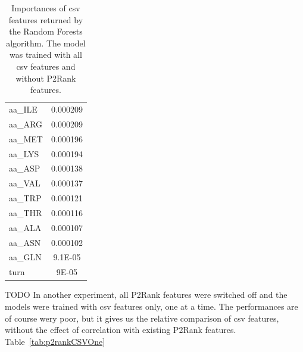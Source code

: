 \begin{table}[]
{\begin{tabular}{@{}lc@{}}
aa\_ILE              & 0.000209            \\
aa\_ARG              & 0.000209            \\
aa\_MET              & 0.000196            \\
aa\_LYS              & 0.000194            \\
aa\_ASP              & 0.000138            \\
aa\_VAL              & 0.000137            \\
aa\_TRP              & 0.000121            \\
aa\_THR              & 0.000116            \\
aa\_ALA              & 0.000107            \\
aa\_ASN              & 0.000102            \\
aa\_GLN              & 9.1E-05             \\
turn                 & 9E-05               \\ \bottomrule
\end{tabular}
}
\caption{Importances of csv features returned by the Random Forests algorithm. The model was trained with all csv features and without P2Rank features.}
\label{tab:importances}
\end{table}

TODO In another experiment, all P2Rank features were switched off and the models were trained with csv features only, one at a time. The performances are of course wery poor, but it gives us the relative comparison of csv features, without the effect of correlation with existing P2Rank features. Table~\ref{tab:p2rankCSVOne}


